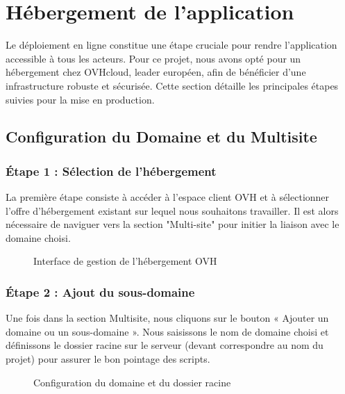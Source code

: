 \chapter{Hébergement de l'application}

Le déploiement en ligne constitue une étape cruciale pour rendre l'application accessible à tous les acteurs. Pour ce projet, nous avons opté pour un hébergement chez OVHcloud, leader européen, afin de bénéficier d'une infrastructure robuste et sécurisée. Cette section détaille les principales étapes suivies pour la mise en production.

\section{Configuration du Domaine et du Multisite}

\subsection{Étape 1 : Sélection de l'hébergement}
La première étape consiste à accéder à l'espace client OVH et à sélectionner l'offre d'hébergement existant sur lequel nous souhaitons travailler. Il est alors nécessaire de naviguer vers la section "Multi-site" pour initier la liaison avec le domaine choisi.

\begin{figure}[H]
    \centering
    \caption{Interface de gestion de l'hébergement OVH}
\end{figure}

\subsection{Étape 2 : Ajout du sous-domaine}
Une fois dans la section Multisite, nous cliquons sur le bouton « Ajouter un domaine ou un sous-domaine ». Nous saisissons le nom de domaine choisi et définissons le dossier racine sur le serveur (devant correspondre au nom du projet) pour assurer le bon pointage des scripts.

\begin{figure}[H]
    \centering
    \caption{Configuration du domaine et du dossier racine}
\end{figure}

